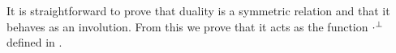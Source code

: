 It is straightforward to prove that duality is a symmetric relation and that it
behaves as an involution. From this we prove that it acts as the function
$\cdot^{\bot}$ defined in .

\begin{code}%
\>[0]%
\>[12]\AgdaSymbol{:}\AgdaSpace{}%
\AgdaSpace{}%
\AgdaSymbol{\}}\AgdaSpace{}%
\AgdaSpace{}%
\AgdaSpace{}%
\AgdaSpace{}%
\AgdaSpace{}%
\AgdaSpace{}%
\AgdaSpace{}%
\AgdaSpace{}%
\<%
\\
\>[0]%
\>[12]\AgdaSymbol{:}\AgdaSpace{}%
\AgdaSpace{}%
\AgdaSpace{}%
\AgdaSymbol{\}}\AgdaSpace{}%
\AgdaSpace{}%
\AgdaSpace{}%
\AgdaSpace{}%
\AgdaSpace{}%
\AgdaSpace{}%
\AgdaSpace{}%
\AgdaSpace{}%
\AgdaSpace{}%
\AgdaSpace{}%
\AgdaSpace{}%
\AgdaSpace{}%
\<%
\\
\>[0]%
\>[12]\AgdaSymbol{:}\AgdaSpace{}%
\AgdaSpace{}%
\AgdaSpace{}%
\AgdaSymbol{\}}\AgdaSpace{}%
\AgdaSpace{}%
\AgdaSpace{}%
\AgdaSpace{}%
\AgdaSpace{}%
\AgdaSpace{}%
\AgdaSpace{}%
\AgdaSpace{}%
\AgdaSpace{}%
\AgdaSpace{}%
\AgdaSpace{}%
\AgdaSpace{}%
\<%
\\
\>[0]%
\>[12]\AgdaSymbol{:}\AgdaSpace{}%
\AgdaSpace{}%
\AgdaSpace{}%
\AgdaSymbol{\}}\AgdaSpace{}%
\AgdaSpace{}%
\AgdaSpace{}%
\AgdaSpace{}%
\AgdaSpace{}%
\AgdaSpace{}%
\AgdaSpace{}%
\AgdaSpace{}%
\AgdaSpace{}%
\AgdaSpace{}%
\AgdaSpace{}%
\AgdaSpace{}%
\<%
\end{code}
